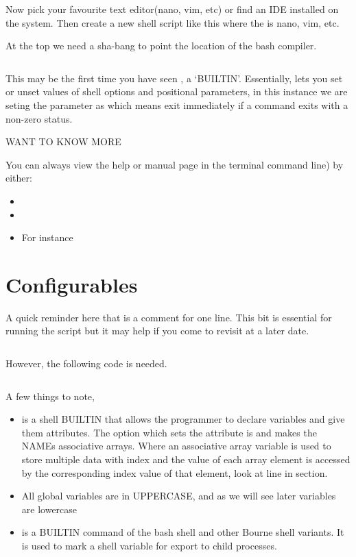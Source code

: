 \documentclass{article}
\begin{document}
Now pick your favourite text editor(nano, vim, etc) or find an IDE installed on the system. Then create a new shell script like this  where the  is nano, vim, etc.

At the top we need a sha-bang to point the location of the bash compiler.

\inputminted[frame=single,firstline=1,lastline=4,linenos]{bash}{rfclogger.sh}

This may be the first time you have seen , a `BUILTIN'. Essentially, lets you set or unset values of shell options and positional parameters, in this instance we are seting the parameter as  which means exit immediately if a command exits with a non-zero status.
\newpage
\begin{shaded}
\textbf{\faSpaceShuttle} \hspace{1em} WANT TO KNOW MORE

You can always view the help or manual page in the terminal command line) by either: 
\begin{itemize}
    \item {}
    \item {}
    \item For instance 
\end{itemize}
\end{shaded}


\section*{Configurables}
\label{sec:config}

A quick reminder here that \code{\#} is a comment for one line. This bit is essential for running the script but it may help if you come to revisit at a later date.

\inputminted[frame=single,firstline=6,lastline=22,linenos]{bash}{rfclogger.sh}

However, the following code is needed.

\inputminted[frame=single,firstline=23,lastline=34,linenos]{bash}{rfclogger.sh}

A few things to note, 
\begin{itemize}
    \item {} is a shell BUILTIN that allows the programmer to declare variables and give them attributes. The  option which sets the attribute is  and makes the NAMEs associative arrays. Where an associative array variable is used to store multiple data with index and the value of each array element is accessed by the corresponding index value of that element, look at line  in  section.
    \item All global variables are in UPPERCASE, and as we will see later  variables are lowercase
    \item {} is a BUILTIN command of the bash shell and other Bourne shell variants. It is used to mark a shell variable for export to child processes.
\end{itemize}
\end{document}
